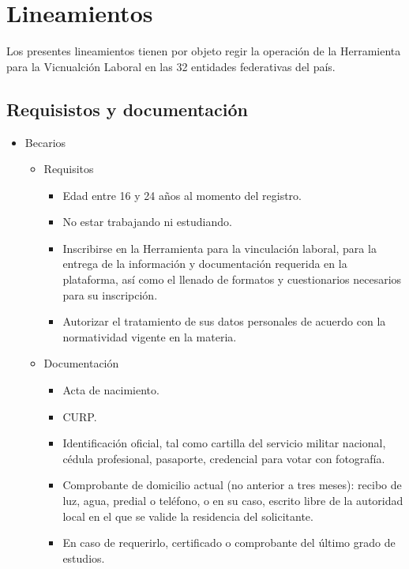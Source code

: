 \chapter{Lineamientos}
Los presentes lineamientos tienen por objeto regir la operación de la Herramienta para la Vicnualción Laboral en las 32 entidades federativas del país.

\section{Requisistos y documentación}

\begin{itemize}
    \item Becarios
        \begin{itemize}
            \item Requisitos 
                \begin{itemize}
                    \item Edad entre 16 y 24 años al momento del registro. 
                    \item No estar trabajando ni estudiando. 
                    \item Inscribirse en la Herramienta para la vinculación laboral, para la entrega de la información y documentación requerida en la plataforma, así como el llenado de formatos y cuestionarios necesarios para su inscripción. 
                    \item Autorizar el tratamiento de sus datos personales de acuerdo con la normatividad vigente en la materia.
                \end{itemize}
            \item Documentación
                \begin{itemize}
                    \item Acta de nacimiento. 
                    \item CURP. 
                    \item Identificación oficial, tal como cartilla del servicio militar nacional, cédula profesional, pasaporte, credencial para votar con fotografía. 
                    \item Comprobante de domicilio actual (no anterior a tres meses): recibo de luz, agua, predial o teléfono, o en su caso, escrito libre de la autoridad local en el que se valide la residencia del solicitante. 
                    \item En caso de requerirlo, certificado o comprobante del último grado de estudios. 

\end{itemize}
\end{itemize}
\end{itemize}
